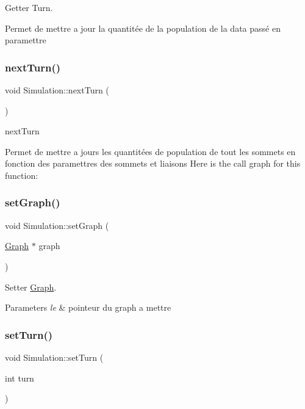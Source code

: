 Getter Turn. 

Permet de mettre a jour la quantitée de la population de la data passé en paramettre \mbox{\label{class_simulation_a37a0a4dc49da67e14a09c650412d0a6e}} 
\subsubsection{\texorpdfstring{next\+Turn()}{nextTurn()}}
{\footnotesize\ttfamily void Simulation\+::next\+Turn (\begin{DoxyParamCaption}{ }\end{DoxyParamCaption})}



next\+Turn 

Permet de mettre a jours les quantitées de population de tout les sommets en fonction des paramettres des sommets et liaisons Here is the call graph for this function\+:
\mbox{\label{class_simulation_a72ce1eb4046e69378685ea0c46cc8448}} 
\subsubsection{\texorpdfstring{set\+Graph()}{setGraph()}}
{\footnotesize\ttfamily void Simulation\+::set\+Graph (\begin{DoxyParamCaption}\item[{\mbox{\hyperlink{class_graph}{Graph}} $\ast$}]{graph }\end{DoxyParamCaption})}



Setter \mbox{\hyperlink{class_graph}{Graph}}. 


\begin{DoxyParams}{Parameters}
{\em le} & pointeur du graph a mettre \\
\hline
\end{DoxyParams}
\mbox{\label{class_simulation_a0929f56d21b2e607e0dda8c7b9c97092}} 
\subsubsection{\texorpdfstring{set\+Turn()}{setTurn()}}
{\footnotesize\ttfamily void Simulation\+::set\+Turn (\begin{DoxyParamCaption}\item[{int}]{turn }\end{DoxyParamCaption})}



